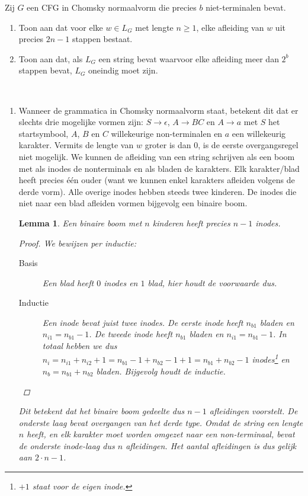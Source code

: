 \documentclass[a4paper]{article}
\newtheorem{lemma}{Lemma}
\begin{document}
\begin{question}
Zij $G$ een CFG in Chomsky normaalvorm die precies $b$ niet-terminalen bevat.
\begin{enumerate}
  \item Toon aan dat voor elke $w \in L_G$ met lengte $n \geq 1$, elke afleiding van $w$ uit precies $2n - 1$ stappen bestaat.
  \item Toon aan dat, als $L_G$ een string bevat waarvoor elke afleiding meer dan $2^b$ stappen bevat, $L_G$ oneindig moet zijn.
\end{enumerate}

\begin{answer}~~
\begin{enumerate}
 \item Wanneer de grammatica in Chomsky normaalvorm staat, betekent dit dat er slechts drie mogelijke vormen zijn: $S\rightarrow \epsilon$, $A\rightarrow BC$ en $A\rightarrow a$ met $S$ het startsymbool, $A$, $B$ en $C$ willekeurige non-terminalen en $a$ een willekeurig karakter. Vermits de lengte van $w$ groter is dan $0$, is de eerste overgangsregel niet mogelijk. We kunnen
 de afleiding van een string schrijven als een boom met als inodes de nonterminals en als bladen de karakters. Elk karakter/blad heeft precies \'e\'en ouder (want we kunnen enkel karakters afleiden volgens de derde vorm). Alle overige inodes hebben steeds twee kinderen. De inodes die niet naar een blad afleiden vormen bijgevolg een binaire boom.
 \begin{lemma}
  Een binaire boom met $n$ kinderen heeft precies $n-1$ inodes.
  \begin{proof}
   We bewijzen per inductie:
   \begin{description}
    \item [Basis] Een blad heeft $0$ inodes en $1$ blad, hier houdt de voorwaarde dus.
    \item [Inductie] Een inode bevat juist twee inodes. De eerste inode heeft $n_{b1}$ bladen en $n_{i1}=n_{b1}-1$. De tweede inode heeft $n_{b1}$ bladen en $n_{i1}=n_{b1}-1$. In totaal
    hebben we dus $n_{i}=n_{i1}+n_{i2}+1=n_{b1}-1+n_{b2}-1+1=n_{b1}+n_{b2}-1$ inodes\footnote{$+1$ staat voor de eigen inode.} en $n_{b}=n_{b1}+n_{b2}$ bladen. Bijgevolg houdt de inductie.
   \end{description}
  \end{proof}
  Dit betekent dat het binaire boom gedeelte dus $n-1$ afleidingen voorstelt. De onderste laag bevat overgangen van het derde type. Omdat de string een lengte $n$ heeft, en elk karakter moet worden omgezet naar een non-terminaal, bevat de onderste inode-laag dus $n$ afleidingen. Het aantal afleidingen is dus gelijk aan $2\cdot n-1$.

\end{lemma}
\end{enumerate}
\end{answer}
\end{question}
\end{document}
